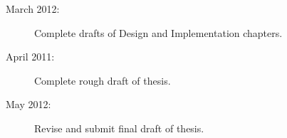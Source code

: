 \documentclass[12pt]{article} %
\begin{document}
\begin{description}
\item[March 2012:] Complete drafts of Design and Implementation chapters. 

\item[April 2011:] Complete rough draft of thesis.

\item[May 2012:] Revise and submit final draft of thesis. 

\end{description}



\singlespacing


\end{document}
